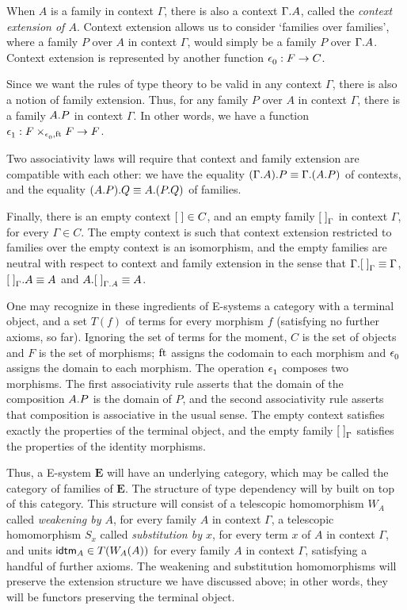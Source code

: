 When $A$ is a family in context $\Gamma$, there is also a context $\ctxext{\Gamma}{A}$,
called the \emph{context extension of $A$}. Context extension allows us to consider
`families over families', where a family $P$ over $A$ in context $\Gamma$, would
simply be a family $P$ over $\ctxext{\Gamma}{A}$. Context extension is represented
by another function $\epsilon_{0}^{} : F\to C$.

Since we want the rules of
type theory to be valid in any context $\Gamma$, there is also a notion of family
extension. Thus, for any family $P$ over $A$ in context $\Gamma$, there is a
family $\ctxext{A}{P}$ in context $\Gamma$. In other words, we have a function
$\epsilon_{1}^{} : F\times_{\epsilon_{0}^{},\mathrm{ft}_{}} F\to F$. 

Two associativity laws will require
that context and family extension are compatible with each other: we have
the equality $\ctxext{{\Gamma}{A}}{P}\jdeq\ctxext{\Gamma}{{A}{P}}$ of contexts,
and the equality $\ctxext{{A}{P}}{Q}\jdeq\ctxext{A}{{P}{Q}}$ of families.

Finally, there is an empty context ${[\;]}\in C$, and an empty family ${[\;]}_{\Gamma}$
in context $\Gamma$, for every $\Gamma\in C$. The empty context is such that context extension
restricted to families over the empty context is an isomorphism, and the empty
families are neutral with respect to context and family extension in the sense
that $\ctxext{\Gamma}{\emptyf[\Gamma]}\jdeq\Gamma$, $\ctxext{\emptyf[\Gamma]}{A}
\jdeq A$ and $\ctxext{A}{\emptyf[\ctxext{\Gamma}{A}]}\jdeq A$. 

One may recognize in these ingredients of E-systems a category with a
terminal object, and a set $T(f)$ of terms for every morphism $f$ (satisfying
no further axioms, so far). Ignoring the set of terms for the moment, $C$ is
the set of objects and $F$ is the set of morphisms; $\mathrm{ft}_{}$ assigns the codomain
to each morphism and $\epsilon_{0}^{}$ assigns the domain to each  morphism. The
operation $\epsilon_{1}^{}$ composes two morphisms. The first associativity rule
asserts that the domain of the composition $\ctxext{A}{P}$ is the domain of
$P$, and the second associativity rule asserts that composition is associative
in the usual sense. The empty context satisfies exactly the properties of the
terminal object, and the empty family ${[\;]}_{\Gamma}$ satisfies the properties
of the identity morphisms. 

Thus, a E-system $\mathbf{E}$ will have an underlying category, which may be called the
category of families of $\mathbf{E}$. The structure of type dependency will by
built on top of this category. This structure will consist of a telescopic homomorphism
$W_A$ called \emph{weakening by $A$}, for every family $A$ in context $\Gamma$,
a telescopic homomorphism $S_x$ called \emph{substitution by $x$}, for every term
$x$ of $A$ in context $\Gamma$, and units $\idtm{A}\in T(W_A(A))$ for every
family $A$ in context $\Gamma$, satisfying a handful of further axioms. 
The weakening and substitution homomorphisms
will preserve the extension structure we have discussed above; in other words,
they will be functors preserving the terminal object.

